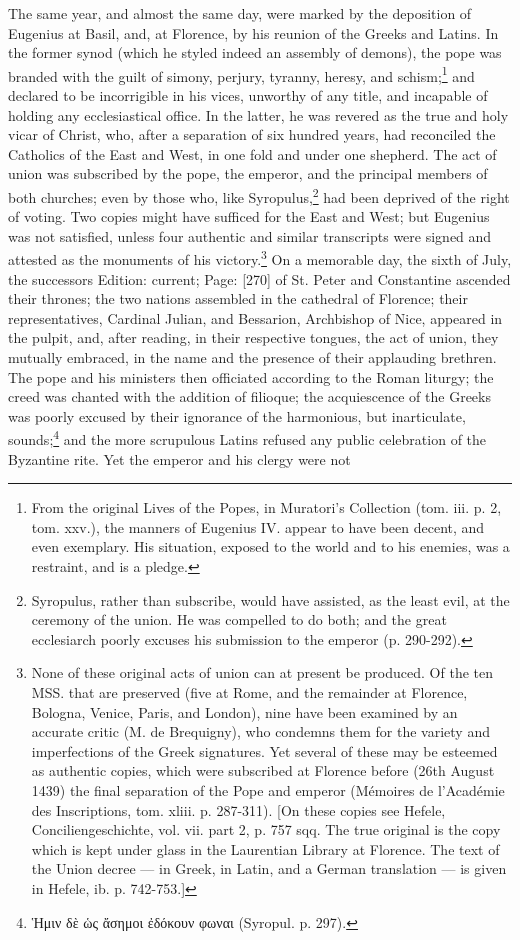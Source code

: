 The same year, and almost the same day, were marked by the deposition of Eugenius at Basil, and, at Florence, by his reunion of the Greeks and Latins. In the former synod (which he styled indeed an assembly of demons), the pope was branded with the guilt of simony, perjury, tyranny, heresy, and schism;\footnote{From the original Lives of the Popes, in Muratori\texthebrew{}’s Collection (tom. iii. p. 2, tom. xxv.), the manners of Eugenius IV. appear to have been decent, and even exemplary. His situation, exposed to the world and to his enemies, was a restraint, and is a pledge.} and declared to be incorrigible in his vices, unworthy of any title, and incapable of holding any ecclesiastical office. In the latter, he was revered as the true and holy vicar of Christ, who, after a separation of six hundred years, had reconciled the Catholics of the East and West, in one fold and under one shepherd. The act of union was subscribed by the pope, the emperor, and the principal members of both churches; even by those who, like Syropulus,\footnote{Syropulus, rather than subscribe, would have assisted, as the least evil, at the ceremony of the union. He was compelled to do both; and the great ecclesiarch poorly excuses his submission to the emperor (p. 290-292).} had been deprived of the right of voting. Two copies might have sufficed for the East and West; but Eugenius was not satisfied, unless four authentic and similar transcripts were signed and attested as the monuments of his victory.\footnote{None of these original acts of union can at present be produced. Of the ten MSS. that are preserved (five at Rome, and the remainder at Florence, Bologna, Venice, Paris, and London), nine have been examined by an accurate critic (M. de Brequigny), who condemns them for the variety and imperfections of the Greek signatures. Yet several of these may be esteemed as authentic copies, which were subscribed at Florence before (26th August 1439) the final separation of the Pope and emperor (Mémoires de l\texthebrew{}’Académie des Inscriptions, tom. xliii. p. 287-311). [On these copies see Hefele, Conciliengeschichte, vol. vii. part 2, p. 757 sqq. The true original is the copy which is kept under glass in the Laurentian Library at Florence. The text of the Union decree \texthebrew{—} in Greek, in Latin, and a German translation \texthebrew{—} is given in Hefele, ib. p. 742-753.]} On a memorable day, the sixth of July, the successors Edition: current; Page: [270] of St. Peter and Constantine ascended their thrones; the two nations assembled in the cathedral of Florence; their representatives, Cardinal Julian, and Bessarion, Archbishop of Nice, appeared in the pulpit, and, after reading, in their respective tongues, the act of union, they mutually embraced, in the name and the presence of their applauding brethren. The pope and his ministers then officiated according to the Roman liturgy; the creed was chanted with the addition of filioque; the acquiescence of the Greeks was poorly excused by their ignorance of the harmonious, but inarticulate, sounds;\footnote{\textgreek{\texthebrew{Ἡ}μιν δ\texthebrew{ὲ ὡ}ς \texthebrew{ἄ}σημοι \texthebrew{ἐ}δόκουν φωναι} (Syropul. p. 297).} and the more scrupulous Latins refused any public celebration of the Byzantine rite. Yet the emperor and his clergy were not 